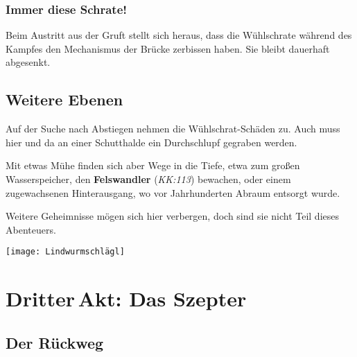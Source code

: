 \subsubsection{Immer diese Schrate!}
\begin{center}
\end{center}
Beim Austritt aus der Gruft stellt sich heraus, dass die Wühlschrate während des Kampfes den Mechanismus der Brücke zerbissen haben. Sie bleibt dauerhaft abgesenkt.



\columnbreak

\subsection{Weitere Ebenen}
Auf der Suche nach Abstiegen nehmen die Wühlschrat-Schäden zu. Auch muss hier und da an einer Schutthalde ein Durchschlupf gegraben werden.

Mit etwas Mühe finden sich aber Wege in die Tiefe, etwa zum großen Wasserspeicher, den \textbf{Felswandler} (\emph{KK:113}) bewachen, oder einem zugewachsenen Hinterausgang, wo vor Jahrhunderten Abraum entsorgt wurde.

Weitere Geheimnisse mögen sich hier verbergen, doch sind sie nicht Teil dieses Abenteuers.

\vspace{0.5cm}
\begin{center}
\texttt{[image: Lindwurmschlägl]}
\end{center}


\spaltenende

\neueseite

\section{Dritter\,Akt: Das Szepter}
\spaltenanfang
\subsection{Der Rückweg}
\label{zuruck}

